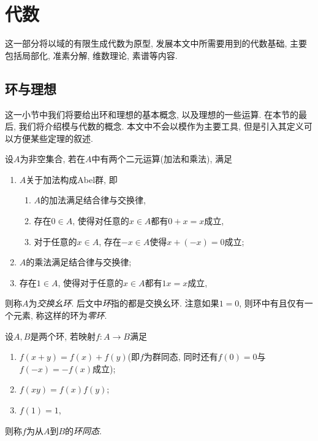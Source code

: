 
\section{代数}

这一部分将以域的有限生成代数为原型, 发展本文中所需要用到的代数基础, 主要包括局部化, 准素分解, 维数理论, 素谱等内容.

\subsection{环与理想}

这一小节中我们将要给出环和理想的基本概念, 以及理想的一些运算. 在本节的最后, 我们将介绍模与代数的概念. 本文中不会以模作为主要工具, 但是引入其定义可以方便某些定理的叙述.

设$A$为非空集合, 若在$A$中有两个二元运算(加法和乘法), 满足
\begin{enumerate}
    \item $A$关于加法构成Abel群, 即
    \begin{enumerate}
        \item $A$的加法满足结合律与交换律,
        \item 存在$0\in A$, 使得对任意的$x\in A$都有$0+x=x$成立,
        \item 对于任意的$x\in A$, 存在$-x\in A$使得$x+(-x)=0$成立;
    \end{enumerate}
    \item $A$的乘法满足结合律与交换律;
    \item 存在$1\in A$, 使得对于任意的$x\in A$都有$1x=x$成立,
\end{enumerate}
则称$A$为\emph{交换幺环}. 后文中\emph{环}指的都是交换幺环. 注意如果$1=0$, 则环中有且仅有一个元素, 称这样的环为\emph{零环}.


设$A, B$是两个环, 若映射$f\colon A\to B$满足
\begin{enumerate}
    \item $f(x+y)=f(x)+f(y)$(即$f$为群同态, 同时还有$f(0)=0$与$f(-x)=-f(x)$成立);
    \item $f(xy)=f(x)f(y)$;
    \item $f(1)=1$,
\end{enumerate}
则称$f$为从$A$到$B$的\emph{环同态}.


